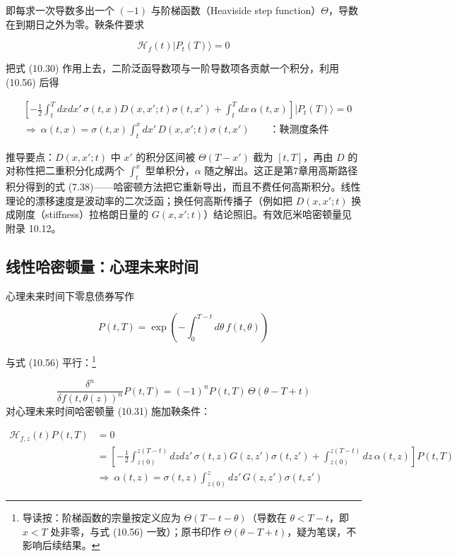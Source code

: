 即每求一次导数多出一个 $(-1)$ 与阶梯函数（Heaviside step function）$\Theta$，导数在到期日之外为零。鞅条件要求

\begin{equation*}
\mathcal{H}_f(t)|P_t(T)\rangle=0
\tag{10.57}
\end{equation*}

把式 (10.30) 作用上去，二阶泛函导数项与一阶导数项各贡献一个积分，利用 (10.56) 后得

\begin{equation*}
\begin{aligned}
&\left[-\frac{1}{2}\int_t^T dxdx'\,\sigma(t,x)D(x,x';t)\sigma(t,x')+\int_t^T dx\,\alpha(t,x)\right]|P_t(T)\rangle=0\\
&\Rightarrow\ \alpha(t,x)=\sigma(t,x)\int_t^x dx'\,D(x,x';t)\sigma(t,x')
\qquad\text{：鞅测度条件}
\end{aligned}
\tag{10.58}
\end{equation*}

推导要点：$D(x,x';t)$ 中 $x'$ 的积分区间被 $\Theta(T-x')$ 截为 $[t,T]$，再由 $D$ 的对称性把二重积分化成两个 $\int_t^x$ 型单积分，$\alpha$ 随之解出。这正是第7章用高斯路径积分得到的式 (7.38)——哈密顿方法把它重新导出，而且不费任何高斯积分。线性理论的漂移速度是波动率的二次泛函；换任何高斯传播子（例如把 $D(x,x';t)$ 换成刚度（stiffness）拉格朗日量的 $G(x,x';t)$）结论照旧。有效厄米哈密顿量见附录 10.12。

\subsection{线性哈密顿量：心理未来时间}

心理未来时间下零息债券写作

\begin{equation*}
P(t,T)=\exp\left(-\int_0^{T-t}d\theta\,f(t,\theta)\right)
\tag{10.59}
\end{equation*}

与式 (10.56) 平行：\footnote{导读按：阶梯函数的宗量按定义应为 $\Theta(T-t-\theta)$（导数在 $\theta<T-t$，即 $x<T$ 处非零，与式 (10.56) 一致）；原书印作 $\Theta(\theta-T+t)$，疑为笔误，不影响后续结果。}

\begin{equation*}
\frac{\delta^n}{\delta f(t,\theta(z))^n}P(t,T)=(-1)^nP(t,T)\,\Theta(\theta-T+t)
\tag{10.60}
\end{equation*}对心理未来时间哈密顿量 (10.31) 施加鞅条件：

\begin{equation*}
\begin{aligned}
\mathcal{H}_{f,z}(t)P(t,T)&=0\\
&=\left[-\frac{1}{2}\int_{z(0)}^{z(T-t)}dzdz'\,\sigma(t,z)G(z,z')\sigma(t,z')+\int_{z(0)}^{z(T-t)}dz\,\alpha(t,z)\right]P(t,T)\\
&\Rightarrow\ \alpha(t,z)=\sigma(t,z)\int_{z(0)}^{z}dz'\,G(z,z')\sigma(t,z')
\end{aligned}
\tag{10.61}
\end{equation*}

